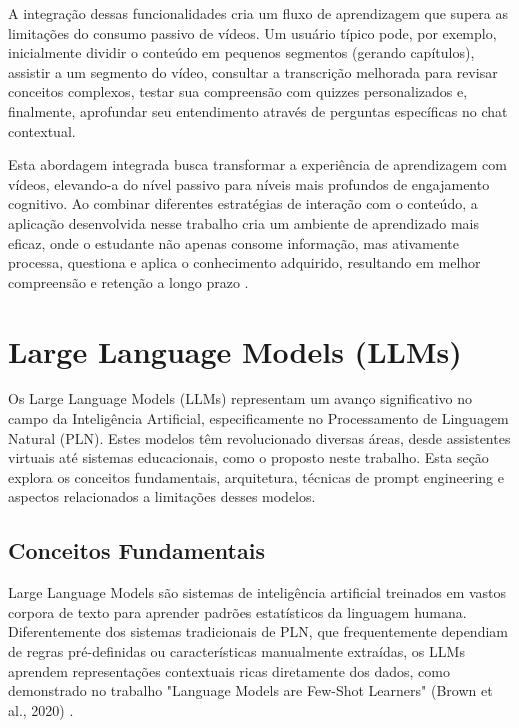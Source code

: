 \documentclass[tcc,capa]{texufpel}
\begin{document}
A integração dessas funcionalidades cria um fluxo de aprendizagem que supera
as limitações do consumo passivo de vídeos. Um usuário típico pode, por exemplo,
inicialmente dividir o conteúdo em pequenos segmentos (gerando capítulos), assistir a um segmento do vídeo, consultar a transcrição melhorada para revisar conceitos complexos, testar sua compreensão com quizzes personalizados e, finalmente,
aprofundar seu entendimento através de perguntas específicas no chat contextual.

Esta abordagem integrada busca transformar a experiência de aprendizagem com
vídeos, elevando-a do nível passivo para níveis mais profundos de engajamento
cognitivo. Ao combinar diferentes estratégias de interação com o conteúdo, a aplicação
desenvolvida nesse trabalho cria um ambiente de aprendizado mais eficaz, onde o
estudante não apenas consome informação, mas ativamente processa, questiona e
aplica o conhecimento adquirido, resultando em melhor compreensão e retenção a
longo prazo \cite{prince2004does}.



\section{Large Language Models (LLMs)}

Os Large Language Models (LLMs) representam um avanço significativo no campo da Inteligência Artificial, especificamente no Processamento de Linguagem Natural (PLN). Estes modelos têm revolucionado diversas áreas, desde assistentes virtuais até sistemas educacionais, como o proposto neste trabalho. Esta seção explora os conceitos fundamentais, arquitetura, técnicas de prompt engineering e aspectos relacionados a limitações desses modelos.

\subsection{Conceitos Fundamentais}

Large Language Models são sistemas de inteligência artificial treinados em vastos corpora de texto para aprender padrões estatísticos da linguagem humana. Diferentemente dos sistemas tradicionais de PLN, que frequentemente dependiam de regras pré-definidas ou características manualmente extraídas, os LLMs aprendem representações contextuais ricas diretamente dos dados, como demonstrado no trabalho "Language Models are Few-Shot Learners" (Brown et al., 2020) \cite{brown2020language}.
\end{document}

